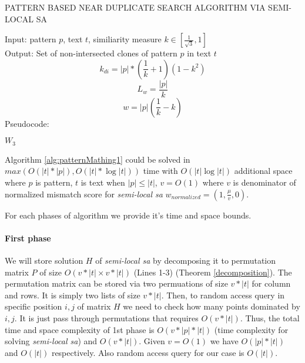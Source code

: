 \begin{algorithm}[H]
\caption{PATTERN BASED NEAR DUPLICATE
SEARCH ALGORITHM VIA SEMI-LOCAL SA}
\label{alg:patternMathing1}
Input: pattern $p$, text $t$, similiarity measure $k \in  [ \frac{1}{\sqrt{3}} ,1  ]$\\
Output: Set of non-intersected clones of pattern $p$ in text $t$
\begin{equation}
    k_{di}=|p|*(\frac{1}{k}+1)(1-k^2)
\end{equation}
\begin{equation}
 L_{w} = \frac{|p|} {k}
\end{equation}
\begin{equation}
  w = |p|(\frac{1}{k} - k)
\end{equation}
Pseudocode:
\begin{algorithmic}[1]
\ENDIF
\ENDFOR
\RETURN $W_3$

\end{algorithmic}
\end{algorithm}


\begin{theorem}
Algorithm \ref{alg:patternMathing1} could  be solved in
 $max(O(|t|*|p|),O(|t| * \log |t|))$  time with $O( |t| \log |t|)$ additional space where $p$ is pattern, $t$ is text when $|p| \leq |t|$, $v=O(1)$ where $v$ is denominator of normalized mismatch score for \emph{semi-local sa}
$w_{normalized} = (1,\frac{\mu}{v},0)$.
\end{theorem}

For each phases of algorithm we provide it's time and space bounds.

\paragraph{First phase}
We will store solution $H$ of \emph{semi-local sa} by decomposing it to permutation matrix $P$ of size $O(v*|t|\times v*|t|)$ (Lines 1-3) (Theorem \ref{decomposition}).
The permutation matrix can be stored via two permuations of size $v*|t|$ for column and rows.
It is simply two lists of size $v*|t|$.
Then, to random access query in specific position $i,j$ of matrix $H$ we need to check how many points dominated by $i,j$.
It is just pass through permutations that requires $O(v*|t|)$.
Thus, the total time and space complexity of 1st phase is $O(v *|p| * |t|)$ (time complexity for solving \emph{semi-local sa}) and $O(v*|t|)$.
Given $v=O(1)$ we have $O(|p| * |t|)$ and $O(|t|)$ respectively.
Also random access query for our case is $O(|t|)$.


